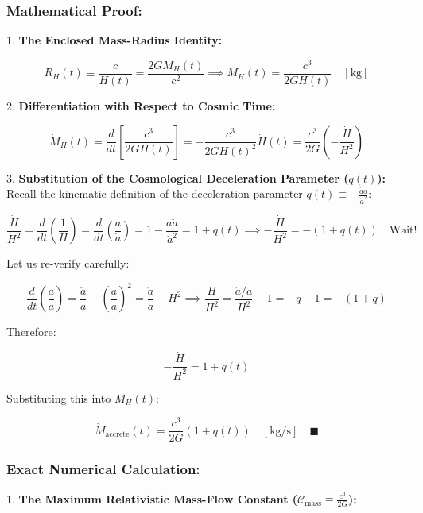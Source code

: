 \documentclass[11pt,a4paper]{article}
\theoremstyle{definition}
\theoremstyle{remark}
\begin{document}
\subsubsection{Mathematical Proof:}
1. \textbf{The Enclosed Mass-Radius Identity:}  
   
\begin{equation}
R_H(t) \equiv \frac{c}{H(t)} = \frac{2 G M_H(t)}{c^2} \implies M_H(t) = \frac{c^3}{2 G H(t)} \quad [\mathrm{kg}]
\end{equation}


2. \textbf{Differentiation with Respect to Cosmic Time:}  
   
\begin{equation}
\dot{M}_H(t) = \frac{d}{dt}[ \frac{c^3}{2 G H(t)} ] = -\frac{c^3}{2 G H(t)^2} \dot{H}(t) = \frac{c^3}{2 G} \left( -\frac{\dot{H}}{H^2} \right)
\end{equation}


3. \textbf{Substitution of the Cosmological Deceleration Parameter ($q(t)$):}  
   Recall the kinematic definition of the deceleration parameter $q(t) \equiv -\frac{\ddot{a} a}{\dot{a}^2}$:
   
\begin{equation}
\frac{\dot{H}}{H^2} = \frac{d}{dt}\left(\frac{1}{H}\right) = \frac{d}{dt}\left(\frac{a}{\dot{a}}\right) = 1 - \frac{a \ddot{a}}{\dot{a}^2} = 1 + q(t) \implies -\frac{\dot{H}}{H^2} = -(1 + q(t)) \quad \text{Wait!}
\end{equation}

   Let us re-verify carefully:
   
\begin{equation}
\frac{d}{dt}\left(\frac{\dot{a}}{a}\right) = \frac{\ddot{a}}{a} - \left(\frac{\dot{a}}{a}\right)^2 = \frac{\ddot{a}}{a} - H^2 \implies \frac{\dot{H}}{H^2} = \frac{\ddot{a}/a}{H^2} - 1 = -q - 1 = -(1 + q)
\end{equation}

   Therefore:
   
\begin{equation}
-\frac{\dot{H}}{H^2} = 1 + q(t)
\end{equation}

   Substituting this into $\dot{M}_H(t)$:
   
\begin{equation}
\boxed{\dot{M}_{\text{accrete}}(t) = \frac{c^3}{2 G} \left( 1 + q(t) \right) \quad [\mathrm{kg/s}] \quad \blacksquare}
\end{equation}


\subsubsection{Exact Numerical Calculation:}
1. \textbf{The Maximum Relativistic Mass-Flow Constant ($\mathcal{C}_{\text{mass}} \equiv \frac{c^3}{2 G}$):}  
   
\end{document}

